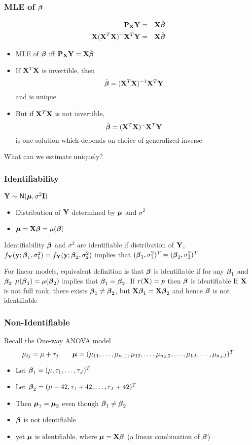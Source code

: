 \documentclass[handout]{beamer}\usepackage[]{graphicx}\usepackage[]{color}
\begin{document}
\begin{frame}
  \frametitle{MLE of $\boldsymbol{\beta}$}
  \begin{eqnarray*}
    \mathbf{P}_{\mathbf{X}} \mathbf{Y} & = & \mathbf{X} \hat{\boldsymbol{\beta}}  \\
\mathbf{X}(\mathbf{X}^T\mathbf{X})^- \mathbf{X}^T\mathbf{Y} & =
& \mathbf{X} \hat{\boldsymbol{\beta}}
  \end{eqnarray*}  \pause
  \begin{itemize}
\item MLE of $\boldsymbol{\beta}$ iff $\mathbf{P}_{\mathbf{X}} \mathbf{Y} = \mathbf{X} \hat{\boldsymbol{\beta}}$
\item If $\mathbf{X}^T\mathbf{X}$ is invertible, then
$$\hat{\boldsymbol{\beta}} = (\mathbf{X}^T\mathbf{X})^{-1} \mathbf{X}^T\mathbf{Y}$$ and is unique  \pause

\item But if $\mathbf{X}^T\mathbf{X}$ is  not invertible, $$\hat{\boldsymbol{\beta}} = (\mathbf{X}^T\mathbf{X})^{-} \mathbf{X}^T\mathbf{Y}$$ is
one solution which depends on choice of generalized inverse
 \pause
  \end{itemize}

What can we estimate uniquely?
\end{frame}
\begin{frame}
  \frametitle{Identifiability}
$\mathbf{Y} \sim \textsf{N}(\boldsymbol{\mu}, \sigma^2 \mathbf{I})$  \pause
  \begin{itemize}
  \item Distribution of $\mathbf{Y}$ determined by $\boldsymbol{\mu}$ and $\sigma^2$  \pause
\item $\boldsymbol{\mu} = \mathbf{X}\boldsymbol{\beta} = \mu(\boldsymbol{\beta})$  \pause
\end{itemize}
  \begin{block}{Identifiability}
$\boldsymbol{\beta}$ and $\sigma^2$ are identifiable if distribution of $\mathbf{Y}$, $f_{\mathbf{Y}}(\mathbf{y};
\boldsymbol{\beta}_1, \sigma^2_1) = f_{\mathbf{Y}}(\mathbf{y};
\boldsymbol{\beta}_2, \sigma^2_2)$ implies that $(\boldsymbol{\beta}_1, \sigma^2_1)^T =  (\boldsymbol{\beta}_2, \sigma^2_2)^T$
  \end{block}  \pause
For linear models, equivalent definition is that $\boldsymbol{\beta}$ is identifiable
if for any $\boldsymbol{\beta}_1$ and $\boldsymbol{\beta}_2$ $\mu(\boldsymbol{\beta}_1) = \mu(\boldsymbol{\beta}_2)$ implies that
$\boldsymbol{\beta}_1 = \boldsymbol{\beta}_2$.  If $ r(\mathbf{X}) = p$ then $\boldsymbol{\beta}$ is identifiable
 \pause
\vspace{12pt}
If $\mathbf{X}$ is not full rank, there exists $\boldsymbol{\beta}_1 \neq \boldsymbol{\beta}_2$, but $\mathbf{X}\boldsymbol{\beta}_1 =
\mathbf{X}\boldsymbol{\beta}_2$ and hence $\boldsymbol{\beta}$ is not identifiable
\end{frame}


\begin{frame}
\frametitle{Non-Identifiable }
  Recall the One-way ANOVA model \pause
$$\mu_{ij} = \mu + \tau_j \qquad \boldsymbol{\mu} = (
    \mu_{11}, \ldots,\mu_{n_1 1},\mu_{12},\ldots, \mu_{n_2,2},\ldots, \mu_{1J},
\ldots,
\mu_{n_J J})^T $$ \pause
\begin{itemize}
\item Let $\boldsymbol{\beta}_{1} = (\mu, \tau_1, \ldots, \tau_J)^T$ \pause
\item Let $\boldsymbol{\beta}_{2} = (\mu - 42, \tau_1 + 42, \ldots, \tau_J + 42)^T$ \pause
\item Then $\boldsymbol{\mu}_{1} = \boldsymbol{\mu}_{2}$ even though  $\boldsymbol{\beta}_1 \neq \boldsymbol{\beta}_2$ \pause
\item $\boldsymbol{\beta}$ is not identifiable \pause
\item yet  $\boldsymbol{\mu}$ is identifiable, where $\boldsymbol{\mu} = \mathbf{X} \boldsymbol{\beta}$  (a linear
  combination of $\boldsymbol{\beta}$)
\end{itemize}
\end{frame}
\end{document}
